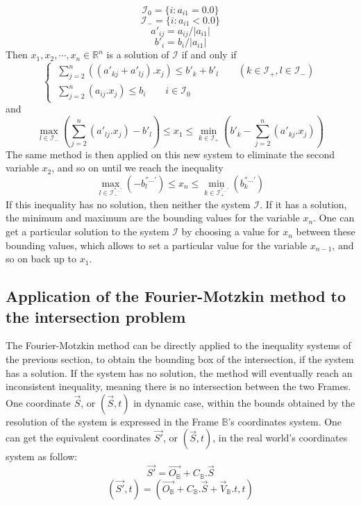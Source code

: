 \documentclass[12pt, a4paper]{article}
\begin{document}
$$\mathcal{I}_0=\{i:a_{i1}=0.0\}$$
$$\mathcal{I}_-=\{i:a_{i1}<0.0\}$$
$$a'_{ij}=a_{ij}/|a_{i1}|$$
$$b'_i=b_i/|a_{i1}|$$
Then $x_1, x_2, \cdots, x_n\in\mathbb{R}^n$ is a solution of $\mathcal{I}$ if and only if
\begin{equation}
\left\{\
\begin{array}{c}
\sum_{j=2}^n((a'_{kj}+a'_{lj}).x_j)\le b'_k+b'_l \qquad (k\in\mathcal{I}_+, l\in\mathcal{I}_-)\\
\sum_{j=2}^n(a_{ij}.x_j)\le b_i \qquad i\in\mathcal{I}_0
\end{array}
\right.
\end{equation}
and
\begin{equation}
\max_{l\in\mathcal{I}_-}(\sum_{j=2}^n(a'_{lj}.x_j)-b'_l)\le x_1\le\min_{k\in\mathcal{I}_+}(b'_k-\sum_{j=2}^n(a'_{kj}.x_j))
\end{equation}
The same method is then applied on this new system to eliminate the second variable $x_2$, and so on until we reach the inequality
\begin{equation}
\max_{l\in\mathcal{I}^{''...'}_-}(-b^{''...'}_l)\le x_n\le\min_{k\in\mathcal{I}^{''...'}_+}(b^{''...'}_k)
\end{equation}
If this inequality has no solution, then neither the system $\mathcal{I}$. If it has a solution, the minimum and maximum are the bounding values for the variable $x_n$. One can get a particular solution to the system $\mathcal{I}$ by choosing a value for $x_n$ between these bounding values, which allows to set a particular value for the variable $x_{n-1}$, and so on back up to $x_1$. 

\subsection{Application of the Fourier-Motzkin method to the intersection problem}

The Fourier-Motzkin method can be directly applied to the inequality systems of the previous section, to obtain the bounding box of the intersection, if the system has a solution. If the system has no solution, the method will eventually reach an inconsistent inequality, meaning there is no intersection between the two Frames.\\

One coordinate $\overrightarrow{S}$, or $(\overrightarrow{S}, t)$ in dynamic case, within the bounds obtained by the resolution of the system is expressed in the Frame $\mathbb{B}$'s coordinates system. One can get the equivalent coordinates $\overrightarrow{S'}$, or $(\overrightarrow{S}, t)$, in the real world's coordinates system as follow:
\begin{equation}
\overrightarrow{S'}=\overrightarrow{O_\mathbb{B}}+C_\mathbb{B}.\overrightarrow{S}
\end{equation}
\begin{equation}
(\overrightarrow{S'},t)=\left(\overrightarrow{O_\mathbb{B}}+C_\mathbb{B}.\overrightarrow{S}+\overrightarrow{V}_\mathbb{B}.t, t\right)
\end{equation}
\end{document}
